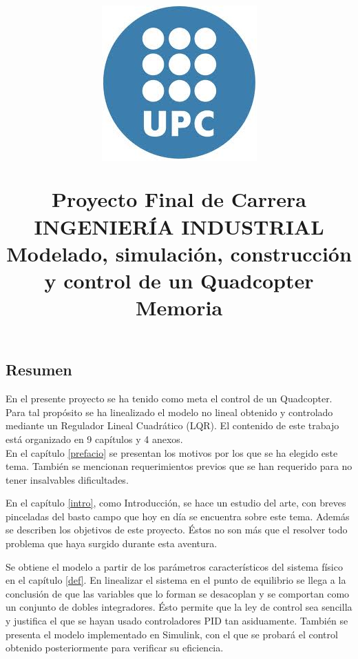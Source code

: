 \documentclass[twoside,11pt]{book}
\title{\begin{center} 
\includegraphics[scale=0.4,bb=0 0 225 225]{images/upc.png} 
\end{center} 
\vspace{0cm} 
Proyecto Final de Carrera\\
INGENIERÍA INDUSTRIAL \\
\vspace{0cm} 
\Huge{Modelado, simulación, construcción y control de un Quadcopter} 
\vspace{0cm} \\ 
Memoria}
\date{}
\begin{document}
\onehalfspacing
\maketitle

\thispagestyle{empty}
\newpage
\begin{center}

\end{center}
\thispagestyle{empty}
\newpage
\setcounter{page}{1}

\begin{center}
\section*{Resumen}
\end{center}


En el presente proyecto se ha tenido como meta el control de un Quadcopter. Para tal propósito se ha linealizado  el modelo no lineal obtenido y controlado mediante un Regulador Lineal Cuadrático (LQR). El contenido de este trabajo está organizado en 9 capítulos y 4 anexos.\\

En el capítulo \ref{prefacio} se presentan los motivos por los que se ha elegido este tema. También se mencionan requerimientos previos que se han requerido para no tener insalvables dificultades. 

En el capítulo \ref{intro}, como Introducción, se hace un estudio del arte, con breves pinceladas del basto campo que hoy en día se encuentra sobre este tema. Además se describen los objetivos de este proyecto. Éstos no son más que el resolver todo problema que haya surgido durante esta aventura.

Se obtiene el modelo a partir de los parámetros característicos del sistema físico en el capítulo \ref{def}. En linealizar el sistema en el punto de equilibrio se llega a la conclusión de que las variables que lo forman se desacoplan y se comportan como un conjunto de dobles integradores. Ésto permite que la ley de control sea sencilla y justifica el que se hayan usado controladores PID tan asiduamente. También se presenta el modelo implementado en Simulink, con el que se probará el control obtenido posteriormente para verificar su eficiencia.
\end{document}
